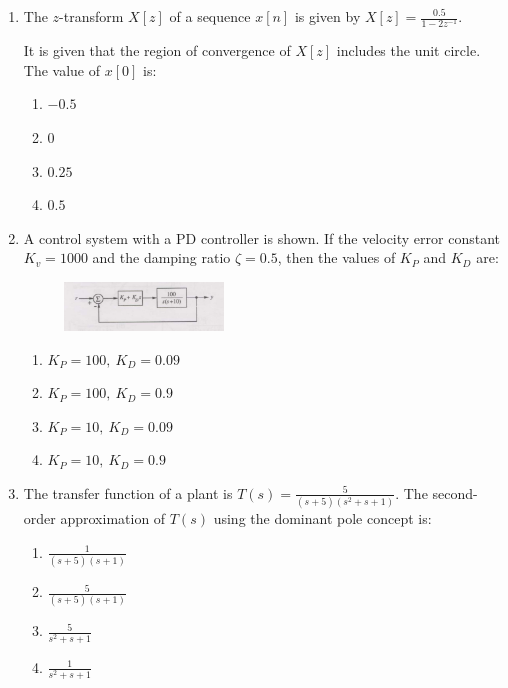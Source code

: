 \documentclass[journal,12pt,onecolumn]{IEEEtran}
\theoremstyle{remark}
\begin{document}
\begin{enumerate}
\item The $z$-transform $X[z]$ of a sequence $x[n]$ is given by
$
X[z]=\frac{0.5}{1-2z^{-1}}.
$

It is given that the region of convergence of $X[z]$ includes the unit circle. The value of $x[0]$ is: 
\hfill{}
\begin{multicols}{4}
\begin{enumerate}
    \item $-0.5$
    \item $0$
    \item $0.25$
    \item $0.5$
\end{enumerate}
\end{multicols}

\item A control system with a PD controller is shown. If the velocity error constant $K_v=1000$ and the damping ratio $\zeta=0.5$, then the values of $K_P$ and $K_D$ are: 

\begin{figure}[ht!]
    \centering
    \includegraphics[width=0.4\textwidth]{Q52.jpg}
    \caption{}
    \label{fig:Q52.jpg}
\end{figure}

\hfill{}
\begin{enumerate}
    \item $K_P=100,\ K_D=0.09$
    \item $K_P=100,\ K_D=0.9$
    \item $K_P=10,\ K_D=0.09$
    \item $K_P=10,\ K_D=0.9$
\end{enumerate}


\item The transfer function of a plant is
$
T(s)=\frac{5}{(s+5)(s^2+s+1)}.
$
The second-order approximation of $T(s)$ using the dominant pole concept is: 
\hfill{}
\begin{multicols}{4}
\begin{enumerate}[label=(\Alph*)]
    \item $\frac{1}{(s+5)(s+1)}$
    \item $\frac{5}{(s+5)(s+1)}$
    \item $\frac{5}{s^2+s+1}$
    \item $\frac{1}{s^2+s+1}$
\end{enumerate}
\end{multicols}


\end{enumerate}
\end{document}
